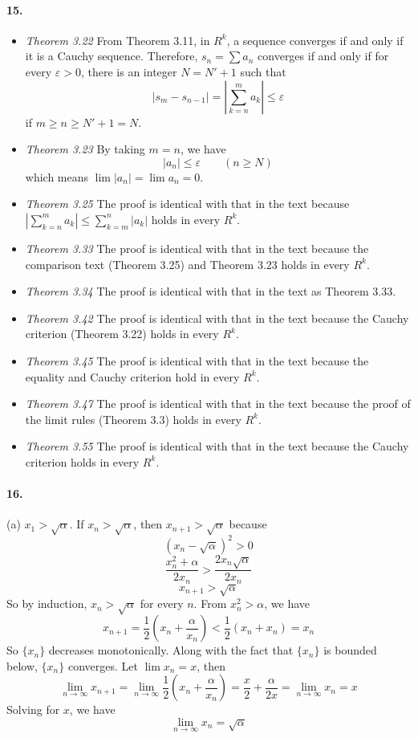 \documentclass[a4paper]{article}
\begin{document}
\paragraph{15.}
\begin{itemize}
\item\textit{Theorem 3.22}
From Theorem 3.11, in $R^k$, a sequence converges if and only if it is a Cauchy sequence. Therefore, $s_n=\sum a_n$ converges if and only if for every $\varepsilon>0$, there is an integer $N=N'+1$ such that
\[
|s_m-s_{n-1}|=\left|\sum_{k=n}^m a_k \right|\leq \varepsilon
\]
if $m\geq n\geq N'+1=N$.

\item\textit{Theorem 3.23}
By taking $m=n$, we have
\[
|a_n|\leq\varepsilon\qquad(n\geq N)
\]
which means $\lim|a_n|=\lim a_n=0$.

\item\textit{Theorem 3.25}
The proof is identical with that in the text because $\left|\sum_{k=n}^m a_k \right|\leq\sum_{k=m}^n|a_k|$ holds in every $R^k$.

\item\textit{Theorem 3.33}
The proof is identical with that in the text because the comparison text (Theorem 3.25) and Theorem 3.23 holds in every $R^k$.

\item\textit{Theorem 3.34}
The proof is identical with that in the text as Theorem 3.33.

\item\textit{Theorem 3.42}
The proof is identical with that in the text because the Cauchy criterion (Theorem 3.22) holds in every $R^k$.

\item\textit{Theorem 3.45}
The proof is identical with that in the text because the equality and Cauchy criterion hold in every $R^k$.

\item\textit{Theorem 3.47}
The proof is identical with that in the text because the proof of the limit rules (Theorem 3.3) holds in every $R^k$.

\item\textit{Theorem 3.55}
The proof is identical with that in the text because the Cauchy criterion holds in every $R^k$.
\end{itemize}

\paragraph{16.}
(a)
$x_1>\sqrt{\alpha}$. If $x_n>\sqrt{\alpha}$, then $x_{n+1}>\sqrt{\alpha}$ because
\[
(x_n-\sqrt{\alpha})^2>0
\]
\[
\frac{x_n^2+\alpha}{2x_n}>\frac{2x_n\sqrt{\alpha}}{2x_n}
\]
\[
x_{n+1}>\sqrt{\alpha}
\]
So by induction, $x_n>\sqrt{\alpha}$ for every $n$. From $x_n^2>\alpha$, we have
\[
x_{n+1}=\frac{1}{2}\left(x_n+\frac{\alpha}{x_n}\right)<\frac{1}{2}\left(x_n+x_n\right)=x_n
\]
So $\{x_n\}$ decreases monotonically. Along with the fact that $\{x_n\}$ is bounded below, $\{x_n\}$ converges. Let $\lim x_n=x$, then
\[
\lim_{n\to\infty} x_{n+1}=\lim_{n\to\infty}\frac{1}{2}\left(x_n+\frac{\alpha}{x_n}\right)=\frac{x}{2}+\frac{\alpha}{2x}=\lim_{n\to\infty} x_n=x
\]
Solving for $x$, we have
\[
\lim_{n\to\infty }x_n=\sqrt{\alpha}
\]
\end{document}
